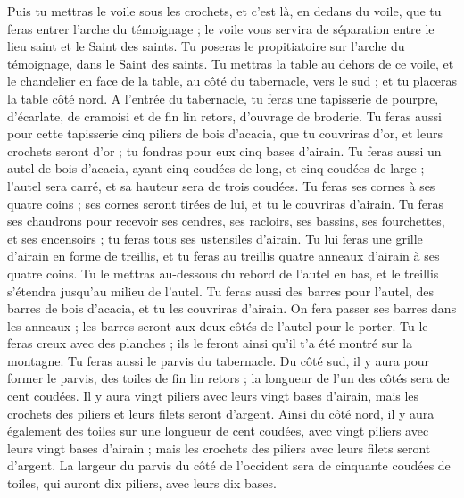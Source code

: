 \begin{multicols}{2}
Puis tu mettras le voile sous les crochets, et c’est là, en dedans du voile, que tu feras entrer l'arche du témoignage ; le voile vous servira de séparation entre le lieu saint et le Saint des saints.
Tu poseras le propitiatoire sur l'arche du témoignage, dans le Saint des saints.
Tu mettras la table au dehors de ce voile, et le chandelier en face de la table, au côté du tabernacle, vers le sud ; et tu placeras la table côté nord.
A l'entrée du tabernacle, tu feras une tapisserie de pourpre, d'écarlate, de cramoisi et de fin lin retors, d'ouvrage de broderie.
Tu feras aussi pour cette tapisserie cinq piliers de bois d’acacia, que tu couvriras d'or, et leurs crochets seront d'or ; tu fondras pour eux cinq bases d'airain.
\VerseOne{}Tu feras aussi un autel de bois d’acacia, ayant cinq coudées de long, et cinq coudées de large ; l'autel sera carré, et sa hauteur sera de trois coudées.
Tu feras ses cornes à ses quatre coins ; ses cornes seront tirées de lui, et tu le couvriras d'airain.
Tu feras ses chaudrons pour recevoir ses cendres, ses racloirs, ses bassins, ses fourchettes, et ses encensoirs ; tu feras tous ses ustensiles d'airain.
Tu lui feras une grille d'airain en forme de treillis, et tu feras au treillis quatre anneaux d'airain à ses quatre coins.
Tu le mettras au-dessous du rebord de l'autel en bas, et le treillis s'étendra jusqu'au milieu de l'autel.
Tu feras aussi des barres pour l'autel, des barres de bois d’acacia, et tu les couvriras d'airain.
On fera passer ses barres dans les anneaux ; les barres seront aux deux côtés de l'autel pour le porter.
Tu le feras creux avec des planches ; ils le feront ainsi qu'il t'a été montré sur la montagne.
Tu feras aussi le parvis du tabernacle. Du côté sud, il y aura pour former le parvis, des toiles de fin lin retors ; la longueur de l'un des côtés sera de cent coudées.
Il y aura vingt piliers avec leurs vingt bases d'airain, mais les crochets des piliers et leurs filets seront d'argent.
Ainsi du côté nord, il y aura également des toiles sur une longueur de cent coudées, avec vingt piliers avec leurs vingt bases d'airain ; mais les crochets des piliers avec leurs filets seront d'argent.
La largeur du parvis du côté de l'occident sera de cinquante coudées de toiles, qui auront dix piliers, avec leurs dix bases.

\end{multicols}
